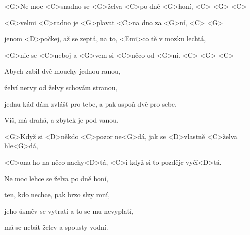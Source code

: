 

\zs
<G>Ne moc <C>snadno se <G>želva <C>po dně <G>honí, <C> <G> <C>

<G>velmi <C>radno je <G>plavat <C>na dno za <G>ní, <C> <G>

jenom <D>počkej, až se zeptá, na to, <Emi>co tě v mozku lechtá,

<G>nic se <C>neboj a <G>vem si <C>něco od <G>ní. <C> <G> <C>
\ks

\zs
Abych zabil dvě mouchy jednou ranou,

želví nervy od želvy schovám stranou,

jednu káď dám zvlášť pro tebe, a pak aspoň dvě pro sebe.

Víš, má drahá, a zbytek je pod vanou.
\ks

\zr
<G>Když si <D>někdo <C>pozor ne<G>dá, jak se <D>vlastně <C>želva hle<G>dá,

<C>ona ho na něco nachy<D>tá, <C>i když si to pozdějc 
vyčí<D>tá.
\kr

\zs
Ne moc lehce se želva po dně honí,

ten, kdo nechce, pak brzo slzy roní,

jeho úsměv se vytratí a to se mu nevyplatí,

má se nebát želev a spousty vodní.
\ks

\zr \kr

\kp
